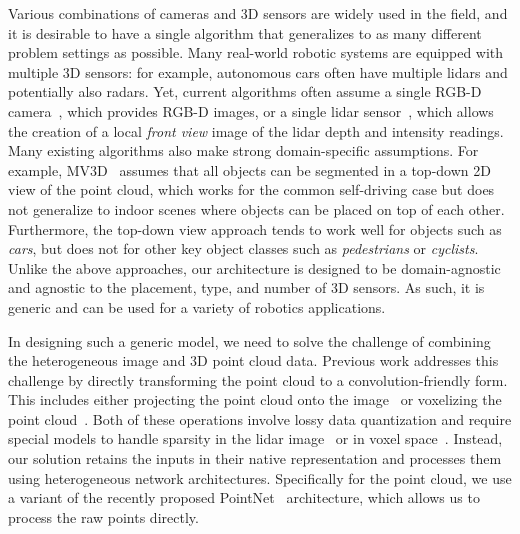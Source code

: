 \documentclass[10pt,twocolumn,letterpaper]{article}
\begin{document}
Various combinations of cameras and 3D sensors are widely used in the field, and it is desirable to have a single algorithm that generalizes to as many different problem settings as possible. Many real-world robotic systems are equipped with multiple 3D sensors: for example, autonomous cars often have multiple lidars and potentially also radars. Yet, current algorithms often assume a single RGB-D camera~\cite{song2016deep,lahoud20172d}, which provides RGB-D images, or a single lidar sensor~\cite{mv3d,velofcn}, which allows the creation of a local \textit{front view} image of the lidar depth and intensity readings. Many existing algorithms also make strong domain-specific assumptions. For example, MV3D~\cite{mv3d} assumes that all objects can be segmented in a  top-down 2D view of the point cloud, which works for the common self-driving case but does not generalize to indoor scenes where objects can be placed on top of each other. Furthermore, the top-down view approach tends to work well for objects such as \textit{cars}, but does not for other key object classes such as \textit{pedestrians} or \textit{cyclists}. Unlike the above approaches,
our architecture is designed to be domain-agnostic and agnostic to the placement, type, and number of 3D sensors. As such, it is generic and can be used for a variety of robotics applications. 

In designing such a generic model, we need to solve the challenge of combining the heterogeneous image and 3D point cloud data. Previous work addresses this challenge by directly transforming the point cloud to a convolution-friendly form. This includes either projecting the point cloud onto the image~\cite{giering2015multi} or voxelizing the point cloud~\cite{song2016deep,li20163d}. Both of these operations involve lossy data quantization and require special models to handle sparsity in the lidar image~\cite{uhrig2017sparsitycnn} or in voxel space~\cite{riegler2017octnet}. Instead, our solution retains the inputs in their native representation and processes them using heterogeneous network architectures. Specifically for the point cloud, we use a variant of the recently proposed PointNet~\cite{qi2016pointnet} architecture, which allows us to process the raw points directly.
\end{document}
